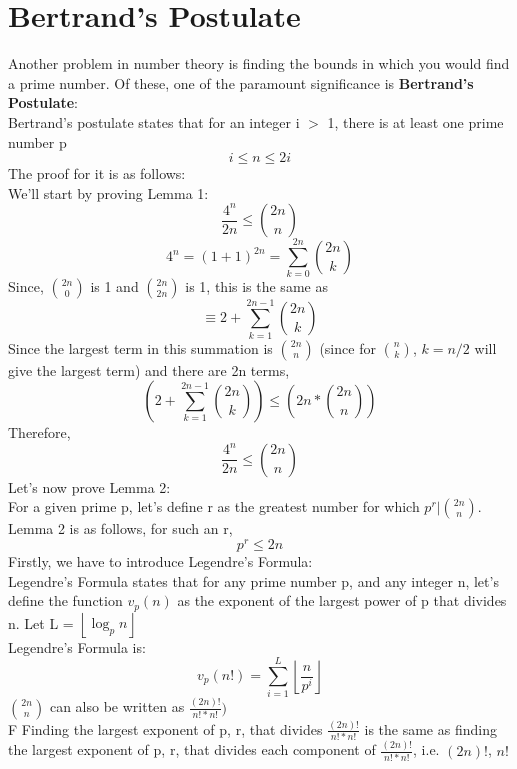 \documentclass[conference]{IEEEtran}
\begin{document}
\section{Bertrand's Postulate}
Another problem in number theory is finding the bounds in which you would find a prime number. Of these, one of the paramount significance is \textbf{Bertrand's Postulate}: \\
Bertrand's postulate states that for an integer i $>$ 1, there is at least one prime number p
\[
    i \leq n \leq 2i 
\]
The proof for it is as follows:\\
We'll start by proving Lemma 1:
\[
    \frac{4^n}{2n} \leq \binom{2n}{n}
\]
\[
  4^n = (1 + 1)^{2n} = \sum_{k = 0}^{2n} \binom{2n}{k}
\]
Since, $\binom{2n}{0}$ is 1 and $\binom{2n}{2n}$ is 1, this is the same as
\[
    \equiv 2 + \sum_{k = 1}^{2n - 1} \binom{2n}{k} 
\]
Since the largest term in this summation is $\binom{2n}{n}$ (since for $\binom{n}{k}$, $k = n/2$ will give the largest term) and there are 2n terms, 
\[
     (2 + \sum_{k = 1}^{2n - 1} \binom{2n}{k}) \leq (2n * \binom{2n}{n})
\]
Therefore, 
\[
    \frac{4^n}{2n} \leq \binom{2n}{n}
\]
Let's now prove Lemma 2:\\
For a given prime p, let's define r as the greatest number for which $p^r | \binom{2n}{n}$. Lemma 2 is as follows, for such an r, 
\[
    p^r \le 2n
\]
Firstly, we have to introduce Legendre's Formula:\\
Legendre's Formula states that for any prime number p, and any integer n, let's define the function $v_p(n)$ as the exponent of the largest power of p that divides n. Let L = $\left\lfloor \log_{p}{n} \right\rfloor$\\
Legendre's Formula is:
\[
    v_{p}(n!) = \sum_{i = 1}^{L} {\left\lfloor \frac{n}{p^i} \right\rfloor}
\]
$\binom{2n}{n}$ can also be written as $\frac{(2n)!}{n!*n!})$\\F
Finding the largest exponent of p, r, that divides $\frac{(2n)!}{n!*n!}$ is the same as finding the largest exponent of p, r, that divides each component of $\frac{(2n)!}{n!*n!}$, i.e. $(2n)!$, $n!$
\end{document}
